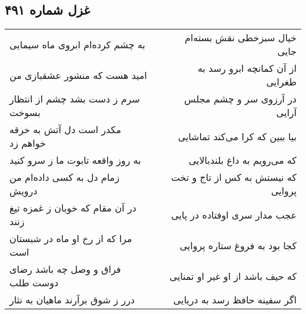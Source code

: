 \begin{center}
\section*{غزل شماره ۴۹۱}
\label{sec:sh491}
\begin{longtable}{l p{0.5cm} r}
به چشم کرده‌ام ابروی ماه سیمایی
&&
خیال سبزخطی نقش بسته‌ام جایی
\\
امید هست که منشور عشقبازی من
&&
از آن کمانچه ابرو رسد به طغرایی
\\
سرم ز دست بشد چشم از انتظار بسوخت
&&
در آرزوی سر و چشم مجلس آرایی
\\
مکدر است دل آتش به خرقه خواهم زد
&&
بیا ببین که کرا می‌کند تماشایی
\\
به روز واقعه تابوت ما ز سرو کنید
&&
که می‌رویم به داغ بلندبالایی
\\
زمام دل به کسی داده‌ام من درویش
&&
که نیستش به کس از تاج و تخت پروایی
\\
در آن مقام که خوبان ز غمزه تیغ زنند
&&
عجب مدار سری اوفتاده در پایی
\\
مرا که از رخ او ماه در شبستان است
&&
کجا بود به فروغ ستاره پروایی
\\
فراق و وصل چه باشد رضای دوست طلب
&&
که حیف باشد از او غیر او تمنایی
\\
درر ز شوق برآرند ماهیان به نثار
&&
اگر سفینه حافظ رسد به دریایی
\\
\end{longtable}
\end{center}
